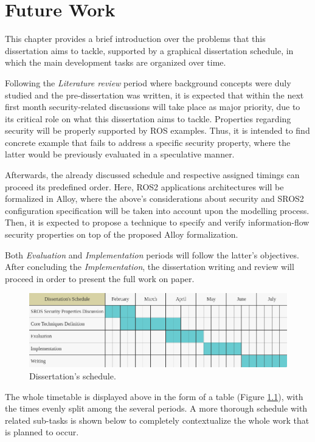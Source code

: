 \chapter{Future Work}\label{c:currWork}

This chapter provides a brief introduction over the problems that this dissertation aims to tackle, supported by a graphical dissertation schedule, in which the main development tasks are organized over time.

Following the \textit{Literature review} period where background concepts were duly studied and the pre-dissertation was written, it is expected that within the next first month security-related discussions will take place as major priority, due to its critical role on what this dissertation aims to tackle. Properties regarding security will be properly supported by ROS examples. Thus, it is intended to find concrete example that fails to address a specific security property, where the latter would be previously evaluated in a speculative manner. 

Afterwards, the already discussed schedule and respective assigned timings can proceed its predefined order. Here, ROS2 applications architectures will be formalized in Alloy, where the above's considerations about security and SROS2 configuration specification will be taken into account upon the modelling process. Then, it is expected to propose  a technique to specify and verify information-flow security properties on top of the proposed Alloy formalization.

Both \textit{Evaluation} and \textit{Implementation} periods will follow the latter's objectives. After concluding the \textit{Implementation}, the dissertation writing and review will proceed in order to present the full work on paper.

\begin{figure}[H]
    \centering
    \includegraphics[width=\linewidth]{img/dissertation-schedule.png}
    \caption{Dissertation's schedule.}
    \label{fig:dissertation-schedule}
\end{figure}

The whole timetable is displayed above in the form of a table (Figure \ref{fig:dissertation-schedule}), with the times evenly split among the several periods. 
A more thorough schedule with related sub-tasks is shown below to completely contextualize the whole work that is planned to occur.

